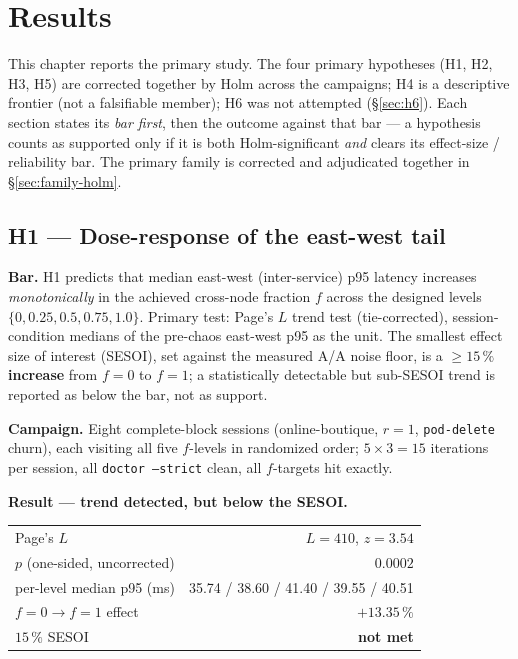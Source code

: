 \chapter{Results}\label{ch:results}

This chapter reports the primary study. The four
primary hypotheses (H1, H2, H3, H5) are corrected together by Holm across
the campaigns; H4 is a descriptive frontier (not a falsifiable member); H6 was
not attempted (\S\ref{sec:h6}). Each section states its \emph{bar
first}, then the outcome against that bar --- a hypothesis counts as supported
only if it is both Holm-significant \emph{and} clears its
effect-size / reliability bar. The primary family is corrected and
adjudicated together in \S\ref{sec:family-holm}.


\section{H1 --- Dose-response of the east-west tail}\label{sec:h1}

\textbf{Bar.} H1 predicts that median east-west (inter-service) p95
latency increases \emph{monotonically} in the achieved cross-node fraction $f$
across the designed levels $\{0, 0.25, 0.5, 0.75, 1.0\}$. Primary test: Page's
$L$ trend test (tie-corrected), session-condition medians of the pre-chaos
east-west p95 as the unit. The smallest effect size of interest (SESOI),
set against the measured A/A noise floor, is a \textbf{$\geq 15\,\%$ increase}
from $f=0$ to $f=1$; a statistically detectable but sub-SESOI trend is reported
as below the bar, not as support.

\textbf{Campaign.} Eight complete-block sessions (online-boutique, $r=1$,
\texttt{pod-delete} churn), each visiting all five $f$-levels in randomized
order; $5\times 3 = 15$ iterations per session, all \texttt{doctor --strict}
clean, all $f$-targets hit exactly.

\textbf{Result --- trend detected, but below the SESOI.}

\begin{center}
\begin{tabular}{lr}
\toprule
Page's $L$ & $L = 410$, $z = 3.54$ \\
$p$ (one-sided, uncorrected) & $0.0002$ \\
per-level median p95 (ms) & 35.74 / 38.60 / 41.40 / 39.55 / 40.51 \\
$f{=}0 \rightarrow f{=}1$ effect & \textbf{$+13.35\,\%$} \\
$15\,\%$ SESOI & \textbf{not met} \\
\bottomrule
\end{tabular}
\end{center}

